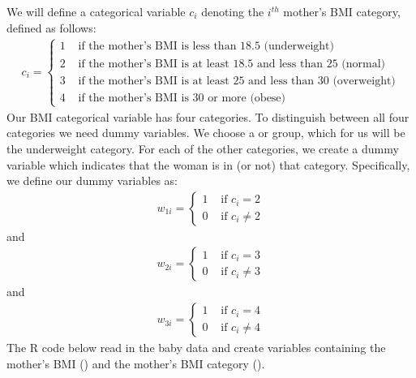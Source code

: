 \documentclass[letterpaper,10pt,english]{jupyterBook}
\begin{document}
\sphinxAtStartPar
We will define a categorical variable \(c_{i}\) denoting the \(i^{th}\) mother’s BMI category, defined as follows:
\begin{equation*}
\begin{split} 
c_{i} =
\begin{cases}
    1 & \text{ if the mother's BMI is less than 18.5 (underweight)} \\
    2 & \text{ if the mother's BMI is at least 18.5 and less than 25 (normal)} \\
    3 & \text{ if the mother's BMI is at least 25 and less than 30 (overweight)} \\
    4 & \text{ if the mother's BMI is 30 or more (obese)} 
\end{cases} 
\end{split}
\end{equation*}
\sphinxAtStartPar
Our BMI categorical variable has four categories. To distinguish between all four categories we need  dummy variables.  We choose a  or  group, which for us will be the underweight category. For each of the other categories, we create a dummy variable which indicates that the woman is in (or not) that category. Specifically, we define our dummy variables as:
\begin{equation*}
\begin{split} 
w_{1i} =
\begin{cases}
    1 & \text{ if } c_{i}=2\\
    0 & \text{ if } c_{i} \neq 2
\end{cases} 
\end{split}
\end{equation*}
\sphinxAtStartPar
and
\begin{equation*}
\begin{split}
w_{2i} =
\begin{cases}
    1 & \text{ if } c_{i}=3\\
    0 & \text{ if } c_{i} \neq 3
\end{cases}
\end{split}
\end{equation*}
\sphinxAtStartPar
and
\begin{equation*}
\begin{split} 
w_{3i} =
\begin{cases}
    1 & \text{ if } c_{i}=4\\
    0 & \text{ if } c_{i} \neq 4
\end{cases}
\end{split}
\end{equation*}
\sphinxAtStartPar
The R code below read in the baby data and create variables containing the mother’s BMI () and the mother’s BMI category ().
\end{document}
